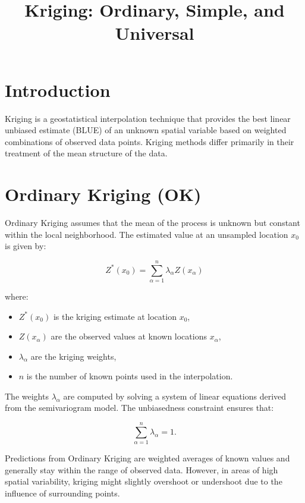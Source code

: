\documentclass{article}
\begin{document}
\title{Kriging: Ordinary, Simple, and Universal}
\author{}
\date{}
\maketitle

\section{Introduction}

Kriging is a geostatistical interpolation technique that provides the best linear unbiased estimate (BLUE) of an unknown spatial variable based on weighted combinations of observed data points. Kriging methods differ primarily in their treatment of the mean structure of the data. 

\section{Ordinary Kriging (OK)}

Ordinary Kriging assumes that the mean of the process is unknown but constant within the local neighborhood. The estimated value at an unsampled location \( x_0 \) is given by:

\begin{equation}
    Z^*(x_0) = \sum_{\alpha=1}^{n} \lambda_{\alpha} Z(x_{\alpha})
\end{equation}

where:
\begin{itemize}
    \item \( Z^*(x_0) \) is the kriging estimate at location \( x_0 \),
    \item \( Z(x_{\alpha}) \) are the observed values at known locations \( x_{\alpha} \),
    \item \( \lambda_{\alpha} \) are the kriging weights,
    \item \( n \) is the number of known points used in the interpolation.
\end{itemize}

The weights \( \lambda_{\alpha} \) are computed by solving a system of linear equations derived from the semivariogram model. The unbiasedness constraint ensures that:

\begin{equation}
    \sum_{\alpha=1}^{n} \lambda_{\alpha} = 1.
\end{equation}

Predictions from Ordinary Kriging are weighted averages of known values and generally stay within the range of observed data. However, in areas of high spatial variability, kriging might slightly overshoot or undershoot due to the influence of surrounding points.
\end{document}
